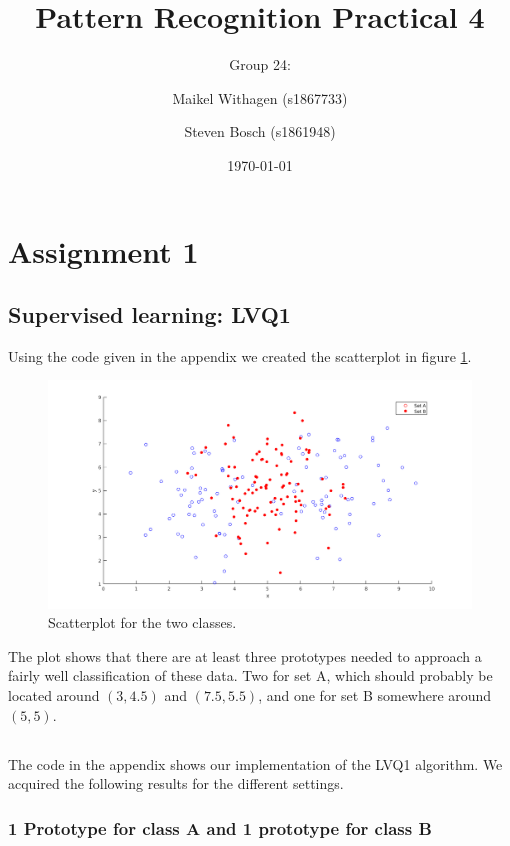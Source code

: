 \documentclass[10pt]{article}
\title{Pattern Recognition Practical 4}
\author{Group 24: \and Maikel Withagen (s1867733) \and Steven Bosch (s1861948)}
\date{\today}
\begin{document}
\section{Assignment 1}
\subsection{Supervised learning: LVQ1}
Using the code given in the appendix we created the scatterplot in figure \ref{fig1.1}.

\begin{figure}[H]
 \centering
 \includegraphics[width=\textwidth]{Fig1_1.png}
 \caption{Scatterplot for the two classes.}
 \label{fig1.1}
\end{figure}

The plot shows that there are at least three prototypes needed to approach a fairly well classification of these data. Two for set A, which should probably be located around $(3,4.5)$ and $(7.5, 5.5)$, and one for set B somewhere around $(5,5)$. 

\subsection{}
The code in the appendix shows our implementation of the LVQ1 algorithm. We acquired the following results for the different settings.

\subsubsection{1 Prototype for class A and 1 prototype for class B}
\end{document}
